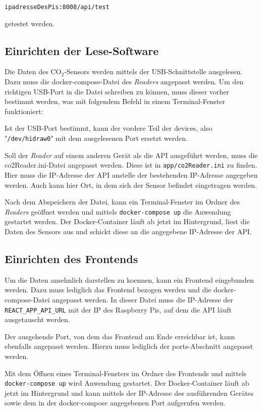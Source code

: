\documentclass[a4paper,
    11pt,
    headings=small,
    ngerman,
    listof=totoc,
    numbers=noenddot]{scrreprt}[2021/11/13]
\begin{document}
\texttt{ipadresseDesPis:8008/api/test}

getestet werden.


\subsection{Einrichten der Lese-Software}

Die Daten des CO$_2$-Sensors werden mittels der USB-Schnittstelle ausgelesen. Dazu muss die docker-compose-Datei des \textit{Readers} angepasst werden. Um den richtigen USB-Port in die Datei schreiben zu können, muss dieser vorher bestimmt werden, was mit folgendem Befehl in einem Terminal-Fenster funktioniert:


Ist der USB-Port bestimmt, kann der vordere Teil der devices, also "\texttt{/dev/hidraw0}"  mit dem ausgelesenen Port ersetzt werden.



Soll der \textit{Reader} auf einem anderen Gerät als die \ac{API} ausgeführt werden, muss die co2Reader.ini-Datei angepasst werden. Diese ist in \texttt{app/co2Reader.ini} zu finden. Hier muss die IP-Adresse der \ac{API} anstelle der bestehenden IP-Adresse angegeben werden. Auch kann hier Ort, in dem sich der Sensor befindet eingetragen werden.

Nach dem Abspeichern der Datei, kann ein Terminal-Fenster im Ordner des \textit{Readers} geöffnet werden und mittels \texttt{docker-compose up} die Anwendung gestartet werden. Der Docker-Container läuft ab jetzt im Hintergrund, liest die Daten des Sensors aus und schickt diese an die angegebene IP-Adresse der \ac{API}.


\subsection{Einrichten des Frontends}

Um die Daten ansehnlich darstellen zu koennen, kann ein Frontend eingebunden werden. Dazu muss lediglich das Frontend bezogen werden und die docker-compose-Datei angepasst werden. In dieser Datei muss die IP-Adresse der \texttt{REACT\_APP\_API\_URL} mit der IP des Raspberry Pis, auf dem die \ac{API} läuft ausgetauscht werden.

Der ausgehende Port, von dem das Frontend am Ende erreichbar ist, kann ebenfalls angepasst werden. Hierzu muss lediglich der ports-Abschnitt angepasst werden.

Mit dem Öffnen eines Terminal-Fensters im Ordner des Frontends und mittels \texttt{docker-compose up} wird Anwendung gestartet. Der Docker-Container läuft ab jetzt im Hintergrund und kann mittels der IP-Adresse des ausführenden Gerätes sowie dem in der docker-compose angegebenen Port aufgerufen werden.
\end{document}
